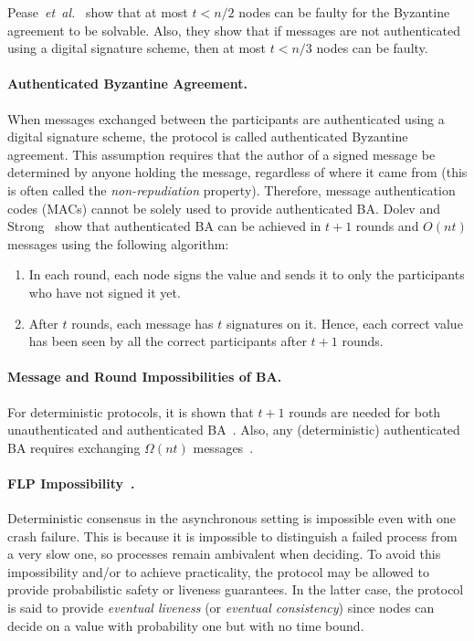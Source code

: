 \documentclass[11pt]{article}
\newcommand{\etal}{\textit{et~al.}}
\theoremstyle{mytheoremstyle}
\begin{document}
Pease~\etal~\cite{pease80reaching} show that at most ${t<n/2}$ nodes can be faulty for the Byzantine agreement to be solvable. Also, they show that if messages are not authenticated using a digital signature scheme, then at most ${t<n/3}$ nodes can be faulty.

\paragraph{Authenticated Byzantine Agreement.}
When messages exchanged between the participants are authenticated using a digital signature scheme, the protocol is called authenticated Byzantine agreement. This assumption requires that the author of a signed message be determined by anyone holding the message, regardless of where it came from (this is often called the \emph{non-repudiation} property). Therefore, message authentication codes (MACs) cannot be solely used to provide authenticated BA. Dolev and Strong~\cite{Dolev:Strong:83} show that authenticated BA can be achieved in $t+1$ rounds and $O(nt)$ messages using the following algorithm:

\begin{enumerate}
	\item In each round, each node signs the value and sends it to only the participants who have not signed it yet.
	\item After $t$ rounds, each message has $t$ signatures on it. Hence, each correct value has been seen by all the correct participants after $t+1$ rounds.
\end{enumerate}

\paragraph{Message and Round Impossibilities of BA.}
For deterministic protocols, it is shown that $t+1$ rounds are needed for both unauthenticated and authenticated BA~\cite{FischerLynch81,Dolev:1982:STOC}. Also, any (deterministic) authenticated BA requires exchanging $\Omega(nt)$ messages~\cite{Dolev:Reischuk:82}.

\paragraph{FLP Impossibility~\cite{FLP}.} Deterministic consensus in the asynchronous setting is impossible even with one crash failure. This is because it is impossible to distinguish a failed process from a very slow one, so processes remain ambivalent when deciding. To avoid this impossibility and/or to achieve practicality, the protocol may be allowed to provide probabilistic safety or liveness guarantees. In the latter case, the protocol is said to provide \emph{eventual liveness} (or \emph{eventual consistency}) since nodes can decide on a value with probability one but with no time bound.
\end{document}
